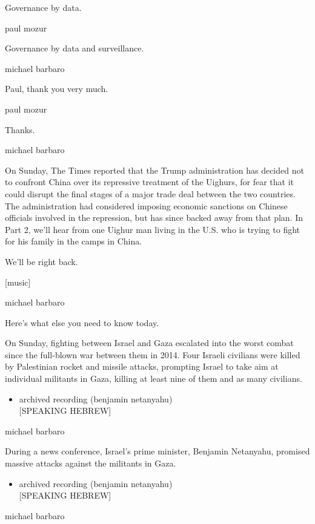 Governance by data.

paul mozur

Governance by data and surveillance.

michael barbaro

Paul, thank you very much.

paul mozur

Thanks.

michael barbaro

On Sunday, The Times reported that the Trump administration has decided
not to confront China over its repressive treatment of the Uighurs, for
fear that it could disrupt the final stages of a major trade deal
between the two countries. The administration had considered imposing
economic sanctions on Chinese officials involved in the repression, but
has since backed away from that plan. In Part 2, we'll hear from one
Uighur man living in the U.S. who is trying to fight for his family in
the camps in China.

We'll be right back.

{[}music{]}

michael barbaro

Here's what else you need to know today.

On Sunday, fighting between Israel and Gaza escalated into the worst
combat since the full-blown war between them in 2014. Four Israeli
civilians were killed by Palestinian rocket and missile attacks,
prompting Israel to take aim at individual militants in Gaza, killing at
least nine of them and as many civilians.

\begin{itemize}
\tightlist
\item
  archived recording (benjamin netanyahu)\\
  {[}SPEAKING HEBREW{]}
\end{itemize}

michael barbaro

During a news conference, Israel's prime minister, Benjamin Netanyahu,
promised massive attacks against the militants in Gaza.

\begin{itemize}
\tightlist
\item
  archived recording (benjamin netanyahu)\\
  {[}SPEAKING HEBREW{]}
\end{itemize}

michael barbaro

